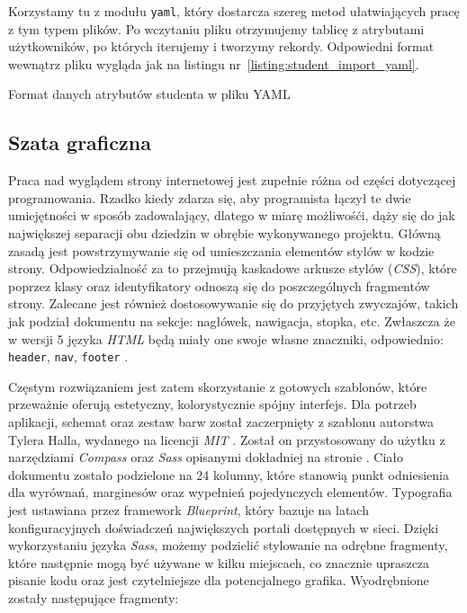 \documentclass[a4paper,12pt]{article}
\begin{document}
Korzystamy tu z modułu \texttt{yaml}, który dostarcza szereg metod ułatwiających pracę z
tym typem plików. Po wczytaniu pliku otrzymujemy tablicę z atrybutami użytkowników, po
których iterujemy i tworzymy rekordy. Odpowiedni format wewnątrz pliku wygląda jak na
listingu nr~\ref{listing:student_import_yaml}.

\begin{listing}
  
  \caption{Format danych atrybutów studenta w pliku YAML}
  \label{listing:student_import_yaml}
\end{listing}

\subsection{Szata graficzna}
Praca nad wyglądem strony internetowej jest zupełnie różna od części dotyczącej
programowania. Rzadko kiedy zdarza się, aby programista łączył te dwie umiejętności w
sposób zadowalający, dlatego w miarę możliwośći, dąży się do jak największej separacji obu
dziedzin w obrębie wykonywanego projektu. Główną zasadą jest powstrzymywanie się od
umieszczania elementów stylów w kodzie strony. Odpowiedzialność za to przejmują kaskadowe
arkusze stylów (\emph{CSS}), które poprzez klasy oraz identyfikatory odnoszą się do
poszczególnych fragmentów strony. Zalecane jest również dostosowywanie się do przyjętych
zwyczajów, takich jak podział dokumentu na sekcje: nagłówek, nawigacja, stopka, etc.
Zwłaszcza że w wersji 5 języka \emph{HTML} będą miały one swoje własne znaczniki,
odpowiednio: \texttt{header}, \texttt{nav}, \texttt{footer} \cite{html5}.


Częstym rozwiązaniem jest zatem skorzystanie z gotowych szablonów, które przeważnie oferują
estetyczny, kolorystycznie spójny interfejs. Dla potrzeb aplikacji, schemat oraz zestaw
barw został zaczerpnięty z szablonu autorstwa Tylera Halla, wydanego na licencji
\emph{MIT} \cite{yui-app-theme}. Został on przystosowany do użytku z narzędziami
\emph{Compass} oraz \emph{Sass} opisanymi dokładniej na stronie \pageref{sec:compass}.
Ciało dokumentu zostało podzielone na 24 kolumny, które stanowią punkt odniesienia dla
wyrównań, marginesów oraz wypełnień pojedynczych elementów. Typografia jest ustawiana
przez framework \emph{Blueprint}, który bazuje na latach konfiguracyjnych doświadczeń
największych portali dostępnych w sieci. Dzięki wykorzystaniu języka \emph{Sass}, możemy
podzielić stylowanie na odrębne fragmenty, które następnie mogą być używane w kilku
miejscach, co znacznie upraszcza pisanie kodu oraz jest czytelniejsze dla potencjalnego
grafika. Wyodrębnione zostały następujące fragmenty:
\end{document}
